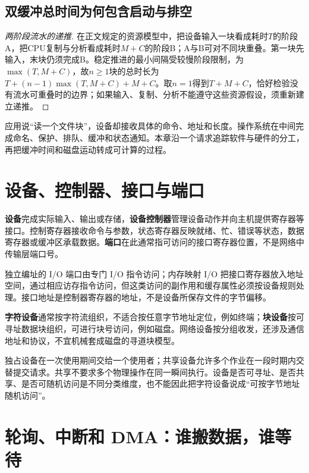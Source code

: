 \subsection{双缓冲总时间为何包含启动与排空}\label{OS05-pipeline-proof}

\begin{proof}[两阶段流水的递推]

在正文规定的资源模型中，把设备输入一块看成耗时\(T\)的阶段A，把CPU复制与分析看成耗时\(M+C\)的阶段B；A与B可对不同块重叠。第一块先输入，末块仍须完成B。稳定推进的最小间隔受较慢阶段限制，为\(\max(T,M+C)\)，故\(n\ge1\)块的总时长为\(T+(n-1)\max(T,M+C)+M+C\)。取\(n=1\)得到\(T+M+C\)，恰好检验没有流水可重叠时的边界；如果输入、复制、分析不能遵守这些资源假设，须重新建立递推。

\end{proof}

应用说``读一个文件块''，设备却接收具体的命令、地址和长度。操作系统在中间完成命名、保护、排队、缓冲和状态通知。本章沿一个请求追踪软件与硬件的分工，再把缓冲时间和磁盘运动转成可计算的过程。

\section{设备、控制器、接口与端口}\label{OS05-7-1}

\textbf{设备}完成实际输入、输出或存储，\textbf{设备控制器}管理设备动作并向主机提供寄存器等接口。控制寄存器接收命令与参数，状态寄存器反映就绪、忙、错误等状态，数据寄存器或缓冲区承载数据。\textbf{端口}在此通常指可访问的接口寄存器位置，不是网络中传输层端口号。

独立编址的 I/O 端口由专门 I/O 指令访问；内存映射 I/O 把接口寄存器放入地址空间，通过相应访存指令访问，但这类访问的副作用和缓存属性必须按设备规则处理。接口地址是控制器寄存器的地址，不是设备所保存文件的字节偏移。

\textbf{字符设备}通常按字符流组织，不适合按任意字节地址定位，例如终端；\textbf{块设备}按可寻址数据块组织，可进行块号访问，例如磁盘。网络设备按分组收发，还涉及通信地址和协议，不宜机械套成磁盘的寻道块模型。

独占设备在一次使用期间交给一个使用者；共享设备允许多个作业在一段时期内交替提交请求。共享不要求多个物理操作在同一瞬间执行。设备是否可寻址、是否共享、是否可随机访问是不同分类维度，也不能因此把字符设备说成``可按字节地址随机访问''。

\section{轮询、中断和 DMA：谁搬数据，谁等待}\label{OS05-7-2}

